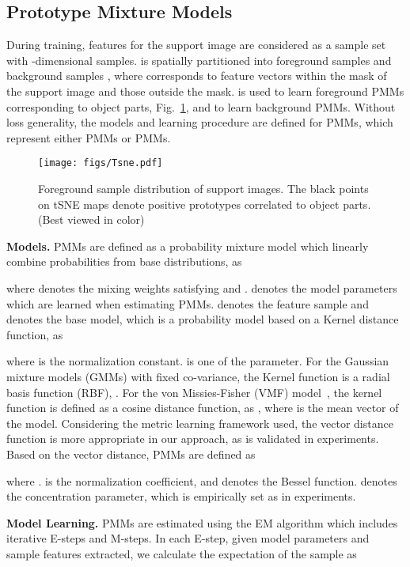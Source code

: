 \documentclass[runningheads]{llncs}
\begin{document}
\subsection{Prototype Mixture Models}
During training, features  for the support image are considered as a sample set with  -dimensional samples.  is spatially partitioned into foreground samples  and background samples , where  corresponds to feature vectors within the mask of the support image and  those outside the mask. 
 is used to learn foreground PMMs corresponding to object parts, Fig.\ \ref{fig:Tsne}, and  to learn background PMMs. Without loss generality, the models and learning procedure are defined for PMMs, which represent either PMMs or PMMs.


\begin{figure}[t]
\centering
\texttt{[image: figs/Tsne.pdf]}
\caption{Foreground sample distribution of support images. The black points on tSNE maps denote positive prototypes correlated to object parts. (Best viewed in color)}
\label{fig:Tsne}
\vspace{-0.2cm}
\end{figure}

\textbf{Models.} PMMs are defined as a probability mixture model which linearly combine probabilities from base distributions, as

where  denotes the mixing weights satisfying  and .  denotes the model parameters which are learned when estimating PMMs.  denotes the  feature sample and  denotes the  base model, which is a probability model based on a Kernel distance function, as 

where  is the normalization constant.  is one of the parameter. 
For the Gaussian mixture models (GMMs) with fixed co-variance, the Kernel function is a radial basis function (RBF), .
For the von Missies-Fisher (VMF) model~\cite{VMF2005}, the kernel function is defined as a cosine distance function, as ,
where  is the mean vector of the  model. 
Considering the metric learning framework used, the vector distance function is more appropriate in our approach, as is validated in experiments.
Based on the vector distance, PMMs are defined as

where .  is the normalization coefficient, and  denotes the Bessel function.  denotes the concentration parameter, which is empirically set as  in experiments.


\textbf{Model Learning.} PMMs are estimated using the EM algorithm which includes iterative E-steps and M-steps. In each E-step, given model parameters and sample features extracted, we calculate the expectation of the sample  as
\end{document}
